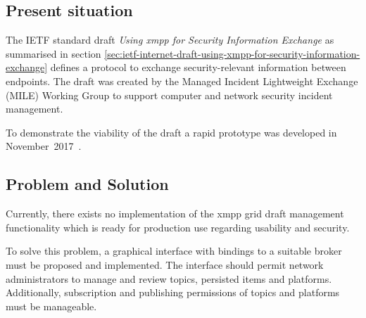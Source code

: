 \subsection{Present situation}
The IETF standard draft \emph{Using \gls{xmpp} for Security Information Exchange} \cite{ietf-mile-xmpp-grid-05} as summarised in section \ref{sec:ietf-internet-draft-using-xmpp-for-security-information-exchange} defines a protocol to exchange security-relevant information between endpoints.
The draft was created by the Managed Incident Lightweight Exchange (MILE) Working Group to support computer and network security incident management.

To demonstrate the viability of the draft a rapid prototype was developed in November~2017~\cite{xmpp-grid-prototype}.

\subsection{Problem and Solution}
Currently, there exists no implementation of the \gls{xmpp} grid draft management functionality which is ready for production use regarding usability and security.

To solve this problem, a graphical interface with bindings to a suitable \gls{broker} must be proposed and implemented.
The interface should permit network administrators to manage and review \glspl{topic}, persisted items and \glspl{platform}.
Additionally, subscription and publishing permissions of \glspl{topic} and \glspl{platform} must be manageable.